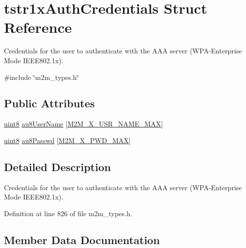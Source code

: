\hypertarget{structtstr1xAuthCredentials}{}\section{tstr1x\+Auth\+Credentials Struct Reference}
\label{structtstr1xAuthCredentials}


Credentials for the user to authenticate with the A\+AA server (W\+P\+A-\/\+Enterprise Mode I\+E\+E\+E802.\+1x).  




{\ttfamily \#include \char`\"{}m2m\+\_\+types.\+h\char`\"{}}

\subsection*{Public Attributes}
\begin{DoxyCompactItemize}
\item 
\hyperlink{group__DataT_ga4df709a77647e870bbf1d955b8edc9a6}{uint8} \hyperlink{structtstr1xAuthCredentials_abe35d19d3503d63da7da8798b2e486e8}{au8\+User\+Name} \mbox{[}\hyperlink{group__WlanDefines_ga0a22970c1dd8d0cb58c5c1b35217618d}{M2\+M\+\_\+X\+\_\+\+U\+S\+R\+\_\+\+N\+A\+M\+E\+\_\+\+M\+AX}\mbox{]}
\item 
\hyperlink{group__DataT_ga4df709a77647e870bbf1d955b8edc9a6}{uint8} \hyperlink{structtstr1xAuthCredentials_acb3e65caea7cd83f1303a9d308ceda25}{au8\+Passwd} \mbox{[}\hyperlink{group__WlanDefines_ga55139884349304f2d747ec28e157368b}{M2\+M\+\_\+X\+\_\+\+P\+W\+D\+\_\+\+M\+AX}\mbox{]}
\end{DoxyCompactItemize}


\subsection{Detailed Description}
Credentials for the user to authenticate with the A\+AA server (W\+P\+A-\/\+Enterprise Mode I\+E\+E\+E802.\+1x). 

Definition at line 826 of file m2m\+\_\+types.\+h.



\subsection{Member Data Documentation}
\mbox{\label{structtstr1xAuthCredentials_acb3e65caea7cd83f1303a9d308ceda25}} 
